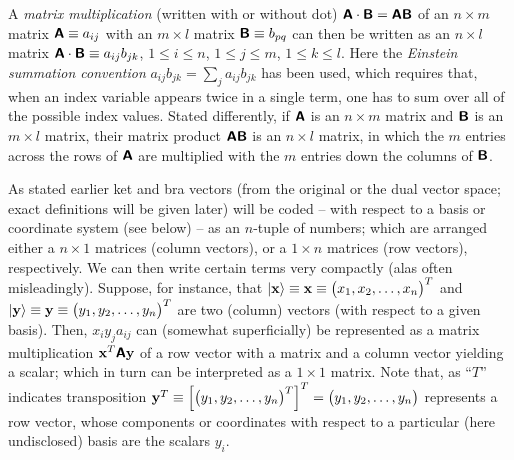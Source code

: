 A {\em matrix multiplication}
 (written with or without dot)
$\textsf{\textbf{A}} \cdot \textsf{\textbf{B}} = \textsf{\textbf{A}}  \textsf{\textbf{B}}$
of an $n \times m$ matrix $\textsf{\textbf{A}}\equiv a_{ij}$
with an $m \times l$ matrix $\textsf{\textbf{B}}\equiv b_{pq}$
can then be written as an $n \times l$ matrix
$\textsf{\textbf{A}} \cdot \textsf{\textbf{B}} \equiv a_{ij}b_{jk}$,
$1\le i\le n$,
$1\le j\le m$,
$1\le k\le l$.
Here the {\em Einstein summation convention}
$a_{ij}b_{jk} = \sum_j a_{ij}b_{jk}$
has been used,
which requires that, when an index variable appears twice in a single term, one has to
sum over all of the possible index values.
Stated differently, if $\textsf{\textbf{A}}$ is an $n \times m$ matrix and $\textsf{\textbf{B}}$ is an $m \times l$ matrix,
their matrix product $\textsf{\textbf{A}}\textsf{\textbf{B}}$ is an $n \times l$ matrix, in which the $m$
entries across the rows of $\textsf{\textbf{A}}$ are multiplied with the $m$ entries down the columns of $\textsf{\textbf{B}}$.

As stated earlier ket and bra vectors (from the original or the dual vector space; exact definitions will be given later)
will be coded -- with respect to a basis or coordinate system (see below) -- as an $n$-tuple of numbers;
which are arranged either a $n \times 1$ matrices (column vectors),
or a $1 \times n$ matrices (row vectors), respectively.
We can then write certain terms very compactly (alas often misleadingly).
Suppose, for instance, that
$\vert {\bf x} \rangle \equiv {\bf x}\equiv \begin{pmatrix}x_1, x_2,\ldots ,x_n\end{pmatrix}^T$
and
$\vert {\bf y} \rangle \equiv {\bf y}\equiv \begin{pmatrix}y_1, y_2,\ldots ,y_n\end{pmatrix}^T$
are two (column) vectors (with respect to a given basis).
Then, $x_iy_j a_{ij}$ can (somewhat superficially) be represented as a matrix multiplication ${\bf x}^T \textsf{\textbf{A}} {\bf y}$ of
a row vector with a matrix and a column vector  yielding a scalar; which in turn can be interpreted as a $1 \times 1$ matrix.
Note that, as ``$T$'' indicates transposition
${\bf y}^T\equiv \left[ \begin{pmatrix}
y_1,
y_2,
\ldots ,
y_n
\end{pmatrix}^T\right]^T
=
\begin{pmatrix}
y_1,
y_2,
\ldots ,
y_n
\end{pmatrix}
$
represents a row vector, whose components or coordinates with respect to a particular (here undisclosed) basis are the scalars $y_i$.

